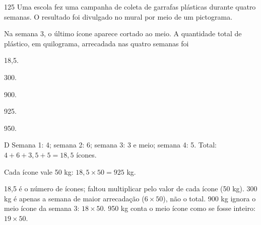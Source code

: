 \begin{questaoinedita}{1}{25}
Uma escola fez uma campanha de coleta de garrafas plásticas durante quatro
semanas. O resultado foi divulgado no mural por meio de um pictograma.

\begin{center}
\end{center}

Na semana 3, o último ícone aparece cortado ao meio. A quantidade total de
plástico, em quilograma, arrecadada nas quatro semanas foi
\begin{alternativas*}[5]
\item 18,5.
\item 300.
\item 900.
\item 925.
\item 950.
\end{alternativas*}
\end{questaoinedita}
\begin{resolucao}{D}
 Semana 1: 4; semana 2: 6; semana 3: 3 e meio; semana 4: 5. Total: $4+6+3{,}5+5=18{,}5$ ícones.

 Cada ícone vale 50 kg: $18{,}5\times50=925$ kg.

\begin{distratores}
 18,5 é o número de ícones; faltou multiplicar pelo valor de cada ícone (50 kg).
 300 kg é apenas a semana de maior arrecadação ($6\times50$), não o total.
 900 kg ignora o meio ícone da semana 3: $18\times50$.
 950 kg conta o meio ícone como se fosse inteiro: $19\times50$.
\end{distratores}
\end{resolucao}

